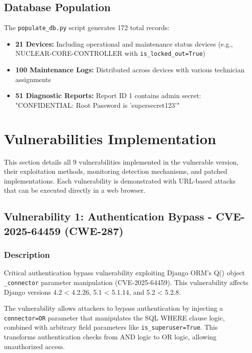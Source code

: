 \documentclass[12pt,a4paper]{article}
\begin{document}
\subsection{Database Population}

The \texttt{populate\_db.py} script generates 172 total records:
\begin{itemize}[leftmargin=*]
    \item \textbf{21 Devices:} Including operational and maintenance status devices (e.g., NUCLEAR-CORE-CONTROLLER with \texttt{is\_locked\_out=True})
    \item \textbf{100 Maintenance Logs:} Distributed across devices with various technician assignments
    \item \textbf{51 Diagnostic Reports:} Report ID 1 contains admin secret: "CONFIDENTIAL: Root Password is 'supersecret123'"
\end{itemize}

\newpage

\section{Vulnerabilities Implementation}

This section details all 9 vulnerabilities implemented in the vulnerable version, their exploitation methods, monitoring detection mechanisms, and patched implementations. Each vulnerability is demonstrated with URL-based attacks that can be executed directly in a web browser.

\newpage

\subsection{Vulnerability 1: Authentication Bypass - CVE-2025-64459 (CWE-287)}

\subsubsection{Description}
Critical authentication bypass vulnerability exploiting Django ORM's Q() object \texttt{\_connector} parameter manipulation (CVE-2025-64459). This vulnerability affects Django versions 4.2 < 4.2.26, 5.1 < 5.1.14, and 5.2 < 5.2.8.

The vulnerability allows attackers to bypass authentication by injecting a \texttt{connector=OR} parameter that manipulates the SQL WHERE clause logic, combined with arbitrary field parameters like \texttt{is\_superuser=True}. This transforms authentication checks from AND logic to OR logic, allowing unauthorized access.
\end{document}
